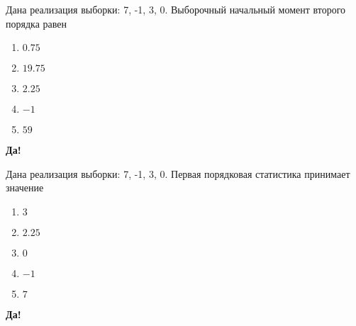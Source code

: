 \documentclass[t]{beamer}
\begin{document}
 \begin{frame} \label{43-Yes} 
\begin{block}{43} 

Дана реализация выборки: 7, -1, 3, 0. Выборочный начальный момент второго порядка равен


 \end{block} 
\begin{enumerate} 
\item[] \hyperlink{43-No}{\beamergotobutton{} $0.75$}
\item[] \hyperlink{43-Yes}{\beamergotobutton{} $19.75$}
\item[] \hyperlink{43-No}{\beamergotobutton{} $2.25$}
\item[] \hyperlink{43-No}{\beamergotobutton{} $-1$}
\item[] \hyperlink{43-No}{\beamergotobutton{} $59$}
\end{enumerate} 

 \textbf{Да!} 
 \hyperlink{44}{}\end{frame} 


 \begin{frame} \label{44-Yes} 
\begin{block}{44} 

Дана реализация выборки: 7, -1, 3, 0. Первая порядковая статистика принимает значение


 \end{block} 
\begin{enumerate} 
\item[] \hyperlink{44-No}{\beamergotobutton{} $3$}
\item[] \hyperlink{44-No}{\beamergotobutton{} $2.25$}
\item[] \hyperlink{44-No}{\beamergotobutton{} $0$}
\item[] \hyperlink{44-Yes}{\beamergotobutton{} $-1$}
\item[] \hyperlink{44-No}{\beamergotobutton{} $7$}
\end{enumerate} 

 \textbf{Да!} 
 \hyperlink{45}{}\end{frame} 
\end{document}
